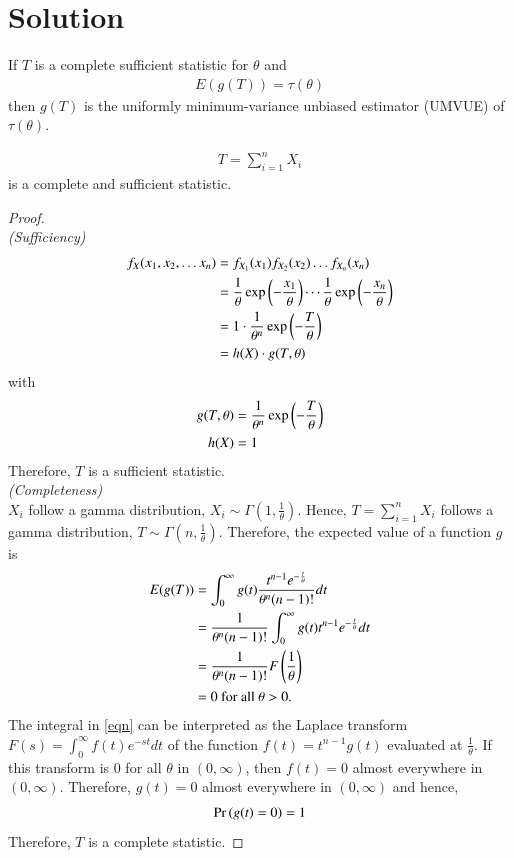 \documentclass[journal,12pt,twocolumn]{IEEEtran}
\begin{document}
\section{Solution}
\begin{theorem}
If $T$ is a complete sufficient statistic for $\theta$ and 
\begin{align}
\label{eqn 2.0.1}
E(g(T)) = \tau(\theta)
\end{align}
then $g(T)$ is the uniformly minimum-variance unbiased estimator (UMVUE) of $\tau(\theta)$.\\
\end{theorem}
\begin{theorem}
\begin{align}
T = \sum_{i=1}^{n} X_i
\end{align}
is a complete and sufficient statistic. 
\end{theorem}
\begin{proof}~\\
\textit{(Sufficiency)}
\begin{align}
f_{X}(x_1, x_2, \ldots x_n) &= f_{X_1}(x_1)f_{X_2}(x_2) \ldots f_{X_n}(x_n)\\
&= \dfrac{1}{\theta} \exp\left(-\dfrac{x_1}{\theta}\right) \cdots \dfrac{1}{\theta} \exp\left(-\dfrac{x_n}{\theta}\right)\\
&= 1 \cdot \dfrac{1}{\theta^n} \exp\left(-\dfrac{T}{\theta}\right)\\
&= h(X) \cdot g(T, \theta) 
\end{align}
with 
\begin{align}
g(T, \theta) &= \dfrac{1}{\theta^n} \exp\left(-\dfrac{T}{\theta}\right)\\
h(X) &= 1
\end{align}
Therefore, $T$ is a sufficient statistic.\\
\textit{(Completeness)}\\
$X_i$ follow a gamma distribution, $X_i \sim \Gamma (1, \frac{1}{\theta})$. Hence, $T = \sum_{i=1}^n X_i $ follows a gamma distribution, $T \sim \Gamma (n, \frac{1}{\theta})$. Therefore, the expected value of a function $g$ is
\begin{align}
E(g(T)) &= 
\int_0 ^{\infty} g(t) \dfrac{t^{n-1} e^{-\frac{t}{\theta}}}{\theta^n(n-1)!} dt\\ \label{eqn}
&= \frac{1}{\theta^n (n-1)!} \int_0 ^{\infty} g(t) t^{n-1} e^{-\frac{t}{\theta}} dt\\ 
&= \frac{1}{\theta^n (n-1)!} F \left(\frac{1}{\theta}\right)\\
&= 0 \text{ for all } \theta > 0.
\end{align}
The integral in \eqref{eqn} can be interpreted as the Laplace transform $F(s) = \int_0 ^{\infty} f(t)e^{-st} dt $ of the function $ f(t) = t^{n-1}g(t)$ evaluated at $\frac{1}{\theta}$. If this transform is $0$ for all $\theta$ in $(0, \infty)$, then $f(t)=0$ almost everywhere in $(0,\infty)$. Therefore, $g(t) = 0$ almost everywhere in $(0, \infty)$ and hence, 
\begin{align}
\Pr\left(g(t)=0\right) = 1
\end{align}
Therefore, $T$ is a complete statistic.
\end{proof}
\end{document}
